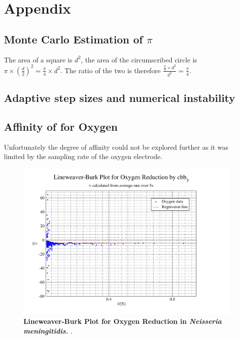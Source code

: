 \appendix
\chapter{Appendix}
\section{\texorpdfstring{Monte Carlo Estimation of $\pi$}{Monte Carlo Estimation of Pi}}
The area of a square is $d^2$, the area of the circumscribed circle is $\pi\times\left(\frac{d}{2}\right)^2 = \frac{\pi}{4}\times d^2$. The ratio of the two is therefore $\frac{\frac{\pi}{4}\times d^2}{d^2} = \frac{\pi}{4}$.

\section{Adaptive step sizes and numerical instability}

\section{\texorpdfstring{Affinity of \cbbthree{} for Oxygen}{Affinity of cbb3 for Oxygen}}
Unfortunately the degree of affinity could not be explored further as it was limited by the sampling rate of the oxygen electrode.
\begin{figure}[h]
 \centering
 \includegraphics[width=14cm, trim=2cm 1cm 4cm 1cm]{./appendix/data/lbplot.pdf}
 \caption[{Lineweaver-Burk Plot for Oxygen Reduction in \textit{Neisseria meningitidis}.}]{{\bf Lineweaver-Burk Plot for Oxygen Reduction in \textit{Neisseria meningitidis.}} .
 \label{fig:o2lb}}
\end{figure}

